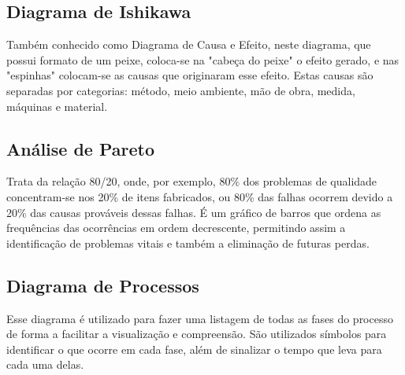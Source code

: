 \subsection{Diagrama de Ishikawa}
Também conhecido como Diagrama de Causa e Efeito, neste diagrama, que possui formato de um peixe, coloca-se na "cabeça do peixe" o efeito gerado, e nas "espinhas" colocam-se as causas que originaram esse efeito. Estas causas são separadas por categorias: método, meio ambiente, mão de obra, medida, máquinas e material.

\subsection{Análise de Pareto}
Trata da relação 80/20, onde, por exemplo, 80\% dos problemas de qualidade concentram-se nos 20\% de itens fabricados, ou 80\% das falhas ocorrem devido a 20\% das causas prováveis dessas falhas. É um gráfico de barros que ordena as frequências das ocorrências em ordem decrescente, permitindo assim a identificação de problemas vitais e também a eliminação de futuras perdas. 

\subsection{Diagrama de Processos}
Esse diagrama é utilizado para fazer uma listagem de todas as fases do processo de forma a facilitar a visualização e compreensão. São utilizados símbolos para identificar o que ocorre em cada fase, além de sinalizar o tempo que leva para cada uma delas.


